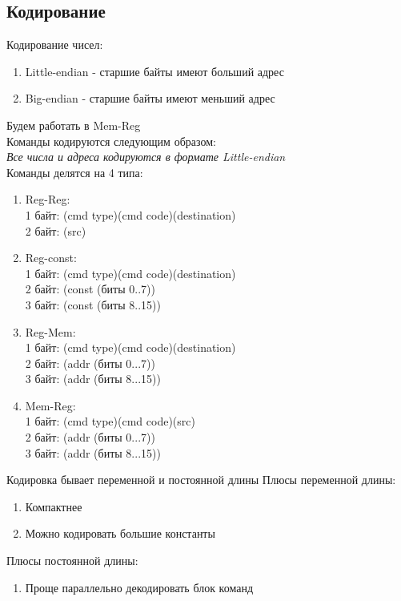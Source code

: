 \documentclass[12pt]{article}
\begin{document}
\subsection{Кодирование}
Кодирование чисел:
\begin{enumerate}
    \item Little-endian - старшие байты имеют больший адрес
    \item Big-endian - старшие байты имеют меньший адрес
\end{enumerate}
Будем работать в Mem-Reg\\
Команды кодируются следующим образом:\\
\textit{Все числа и адреса кодируются в формате Little-endian}\\
Команды делятся на 4 типа:
\begin{enumerate}
    \item Reg-Reg:\\
    1 байт: (cmd type)(cmd code)(destination)\\
    2 байт: (src)
    \item Reg-const:\\
    1 байт: (cmd type)(cmd code)(destination)\\
    2 байт: (const (биты 0..7))\\
    3 байт: (const (биты 8..15))
    \item Reg-Mem:\\
    1 байт: (cmd type)(cmd code)(destination)\\
    2 байт: (addr (биты 0...7))\\
    3 байт: (addr (биты 8...15))
    \item Mem-Reg:\\
    1 байт: (cmd type)(cmd code)(src)\\
    2 байт: (addr (биты 0...7))\\
    3 байт: (addr (биты 8...15))
\end{enumerate}
Кодировка бывает переменной и постоянной длины
Плюсы переменной длины:
\begin{enumerate}
    \item Компактнее
    \item Можно кодировать большие константы
\end{enumerate}
Плюсы постоянной длины:
\begin{enumerate}
    \item Проще параллельно декодировать блок команд
\end{enumerate}
\end{document}
